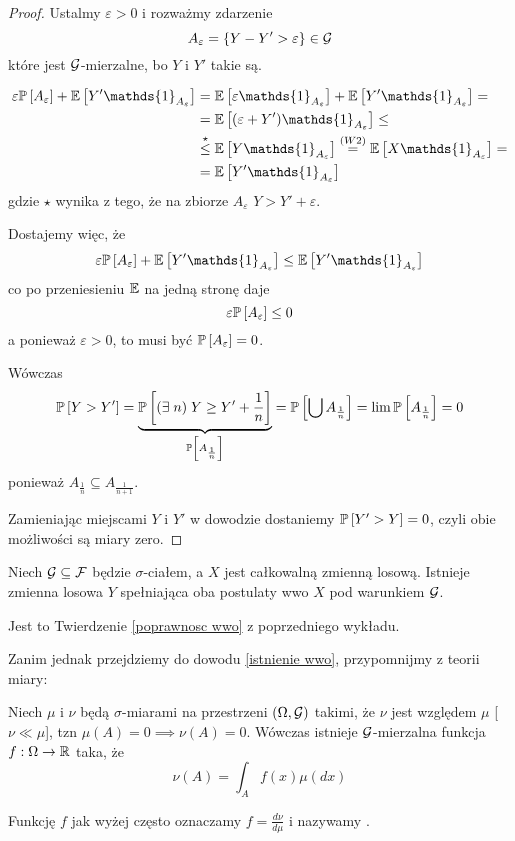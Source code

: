 \begin{proof}
  Ustalmy $\varepsilon>0$ i rozważmy zdarzenie
  $$A_\varepsilon=\{Y-Y'>\varepsilon\}\in \mathcal{G}$$
  które jest $\mathcal{G}$-mierzalne, bo $Y$ i $Y'$ takie są.

  \begin{align*}
    \varepsilon\prob{A_\varepsilon}+\expected{Y'\mathds{1}_{A_\varepsilon}}&=\expected{\varepsilon\mathds{1}_{A_\varepsilon}}+\expected{Y'\mathds{1}_{A_\varepsilon}}=\\
      &=\expected{(\varepsilon+Y')\mathds{1}_{A_\varepsilon}}\leq\\
      &\overset{\star}{\leq}\expected{Y\mathds{1}_{A_\varepsilon}}\overset{(W2)}{=}\expected{X\mathds{1}_{A_\varepsilon}}=\\
      &=\expected{Y'\mathds{1}_{A_\varepsilon}}
  \end{align*}
  gdzie $\star$ wynika z tego, że na zbiorze $A_\varepsilon$ $Y>Y'+\varepsilon$.

  Dostajemy więc, że
  $$\varepsilon\prob{A_\varepsilon}+\expected{Y'\mathds{1}_{A_\varepsilon}}\leq\expected{Y'\mathds{1}_{A_\varepsilon}}$$
  co po przeniesieniu $\expected$ na jedną stronę daje
  $$\varepsilon\prob{A_\varepsilon}\leq0$$
  a ponieważ $\varepsilon>0$, to musi być $\prob{A_\varepsilon}=0$.

  Wówczas 
$$\prob{Y>Y'}=\underbrace{\prob{(\exists\;n)\;Y\geq Y'+\frac{1}{n}}}_{\prob{A_\frac{1}{n}}}=\prob{\bigcup A_\frac{1}{n}}=\lim\prob{A_{\frac{1}{n}}}=0$$
  ponieważ $A_\frac{1}{n}\subseteq A_{\frac{1}{n+1}}$.

  Zamieniając miejscami $Y$ i $Y'$ w dowodzie dostaniemy $\prob{Y'>Y}=0$, czyli obie możliwości są miary zero.
\end{proof}

\begin{theorem}\label{istnienie wwo}
  Niech $\mathcal{G}\subseteq\mathcal{F}$ będzie $\sigma$-ciałem, a $X$ jest całkowalną zmienną losową. Istnieje zmienna losowa $Y$ spełniająca oba postulaty wwo $X$ pod warunkiem $\mathcal{G}$.
\end{theorem}

Jest to Twierdzenie \ref{poprawnosc wwo} z poprzedniego wykładu.

Zanim jednak przejdziemy do dowodu \ref{istnienie wwo}, przypomnijmy  z teorii miary:
\begin{dygresja}
  Niech $\mu$ i $\nu$ będą $\sigma$-miarami na przestrzeni $(\Omega,\mathcal{G})$ takimi, że $\nu$ jest  względem $\mu$ [$\nu\ll\mu$], tzn $\mu(A)=0\implies\nu(A)=0$. Wówczas istnieje $\mathcal{G}$-mierzalna funkcja $f:\Omega\to\operatorname{\mathbb{R}}$ taka, że
  $$\nu(A)=\int_Af(x)\mu(dx)$$
\end{dygresja}
Funkcję $f$ jak wyżej często oznaczamy $f=\frac{d\nu}{d\mu}$ i nazywamy .

